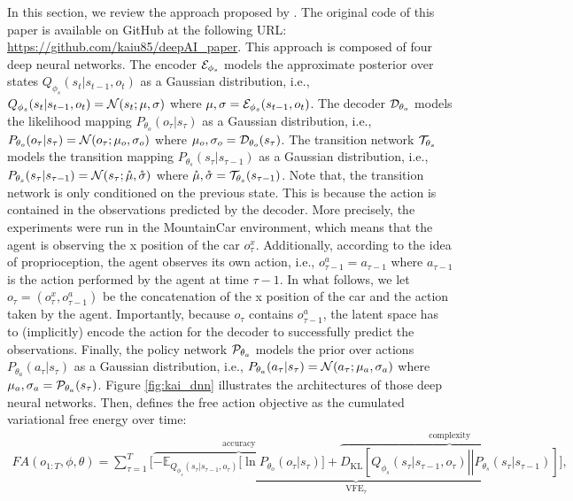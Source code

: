 \documentclass[twoside,11pt]{article}
\let\oldmathcal\mathcal
\renewcommand{\mathcal}[1]{%
  \IfSubStr{ABCDEFGHIJKLMNOPQRSTUVWXYZ}{#1}{\oldmathcal{#1}}{\mathdutchcal{#1}}
}
\newcommand{\kl}[2]{D_{\mathrm{KL}} \left[ \left. \left. #1 \right|\right| #2 \right] }
\begin{document}
In this section, we review the approach proposed by \citet{DAI_Kai}. The original code of this paper is available on GitHub at the following URL: \url{https://github.com/kaiu85/deepAI_paper}. This approach is composed of four deep neural networks. The encoder $\mathcal{E}_{\phi_s}$ models the approximate posterior over states $Q_{\phi_s}(s_t|s_{t-1}, o_t)$ as a Gaussian distribution, i.e., $Q_{\phi_s}(s_t|s_{t-1}, o_t) = \mathcal{N}(s_t;\mu, \sigma)$ where $\mu, \sigma = \mathcal{E}_{\phi_s}(s_{t-1}, o_t)$. The decoder $\mathcal{D}_{\theta_o}$ models the likelihood mapping $P_{\theta_o}(o_\tau|s_\tau)$ as a Gaussian distribution, i.e., $P_{\theta_o}(o_\tau|s_\tau) = \mathcal{N}(o_\tau;\mu_o, \sigma_o)$ where $\mu_o, \sigma_o = \mathcal{D}_{\theta_o}(s_\tau)$. The transition network $\mathcal{T}_{\theta_s}$ models the transition mapping $P_{\theta_s}(s_\tau|s_{\tau-1})$ as a Gaussian distribution, i.e., $P_{\theta_s}(s_\tau|s_{\tau-1}) = \mathcal{N}(s_\tau;\mathring{\mu}, \mathring{\sigma})$ where $\mathring{\mu}, \mathring{\sigma} = \mathcal{T}_{\theta_s}(s_{\tau-1})$. Note that, the transition network is only conditioned on the previous state. This is because the action is contained in the observations predicted by the decoder. More precisely, the experiments were run in the MountainCar environment, which means that the agent is observing the x position of the car $o_\tau^x$. Additionally, according to the idea of proprioception, the agent observes its own action, i.e., $o^a_{\tau-1} = a_{\tau-1}$ where $a_{\tau-1}$ is the action performed by the agent at time $\tau-1$. In what follows, we let $o_\tau = (o^x_\tau, o^a_{\tau-1})$ be the concatenation of the x position of the car and the action taken by the agent. Importantly, because $o_\tau$ contains $o^a_{\tau-1}$, the latent space has to (implicitly) encode the action for the decoder to successfully predict the observations. Finally, the policy network $\mathcal{P}_{\theta_a}$ models the prior over actions $P_{\theta_a}(a_\tau|s_\tau)$ as a Gaussian distribution, i.e., $P_{\theta_a}(a_\tau|s_\tau) = \mathcal{N}(a_\tau;\mu_a, \sigma_a)$ where $\mu_a, \sigma_a = \mathcal{P}_{\theta_a}(s_\tau)$. Figure \ref{fig:kai_dnn} illustrates the architectures of those deep neural networks. Then, \citet{DAI_Kai} defines the free action objective as the cumulated variational free energy over time:
\begin{align*}
FA(o_{1:T}, \phi, \theta) = \sum_{\tau = 1}^T \Bigg[\underbrace{\overbrace{- \mathbb{E}_{Q_{\phi_s}(s_\tau|s_{\tau-1}, o_\tau)}\Big[\ln P_{\theta_o}(o_\tau|s_\tau)\Big]}^{\text{accuracy}} + \overbrace{\kl{Q_{\phi_s}(s_\tau|s_{\tau-1}, o_\tau)}{P_{\theta_s}(s_\tau|s_{\tau-1})}}^{\text{complexity}} }_{\text{VFE}_\tau}\Bigg],
\end{align*}
\end{document}
